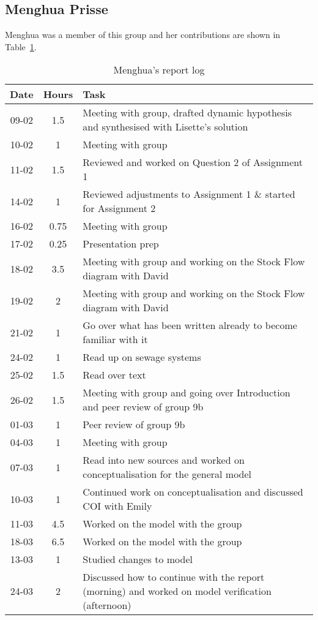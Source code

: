 
\subsection{Menghua Prisse}
Menghua was a member of this group and her contributions are shown in Table~\ref{tab:menghua_log}. 
\begin{longtable}[c]{c|c|m{35em}}
\caption{Menghua's report log}
\label{tab:menghua_log}\\
\textbf{Date}& \textbf{Hours} & \textbf{Task} \\
\hline
\endfirsthead
%
\endhead
%
09-02  & 1.5 & Meeting with group, drafted dynamic hypothesis and synthesised with Lisette's solution\\
10-02 & 1 & Meeting with group \\ 
11-02 & 1.5 & Reviewed and worked on Question 2 of Assignment 1 \\
14-02 & 1 & Reviewed adjustments to Assignment 1 \& started for Assignment 2 \\ 
16-02 & 0.75 & Meeting with group \\ 
17-02 & 0.25 & Presentation prep \\
18-02 & 3.5 & Meeting with group and working on the Stock Flow diagram with David  \\
19-02 & 2 & Meeting with group and working on the Stock Flow diagram with David \\ 
21-02 & 1 & Go over what has been written already to become familiar with it \\
24-02 & 1 & Read up on sewage systems \\ 
25-02 & 1.5 & Read over text \\ 
26-02 & 1.5 & Meeting with group and going over Introduction and peer review of group 9b \\ 
01-03 & 1 & Peer review of group 9b \\
04-03 & 1 & Meeting with group \\
07-03 & 1 & Read into new sources and worked on conceptualisation for the general model \\ 
10-03 & 1 & Continued work on conceptualisation and discussed COI with Emily \\ 
11-03 & 4.5 & Worked on the model with the group \\
18-03 & 6.5 & Worked on the model with the group \\
13-03 & 1 & Studied changes to model \\ 
24-03 & 2 & Discussed how to continue with the report (morning) and worked on model verification (afternoon) \\ 

\end{longtable}
